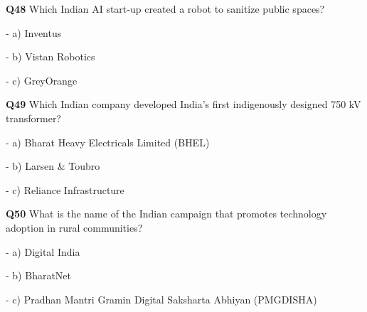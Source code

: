 \textbf{Q48} Which Indian AI start‑up created a robot to sanitize public spaces?\par
\quad - a) Inventus\par
\quad - b) Vistan Robotics\par
\quad - c) GreyOrange\par

\textbf{Q49} Which Indian company developed India's first indigenously designed 750 kV transformer?\par
\quad - a) Bharat Heavy Electricals Limited (BHEL)\par
\quad - b) Larsen & Toubro\par
\quad - c) Reliance Infrastructure\par

\textbf{Q50} What is the name of the Indian campaign that promotes technology adoption in rural communities?\par
\quad - a) Digital India\par
\quad - b) BharatNet\par
\quad - c) Pradhan Mantri Gramin Digital Saksharta Abhiyan (PMGDISHA)\par